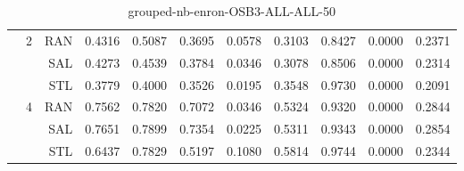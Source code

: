 \begin{center}
\begin{table}[htbp]
\begin{tabular}{ | r | r | r | r | r | r | r | r | r | r | r |}
 & \multirow{3}{*}{2} & RAN & 0.4316 & 0.5087 & 0.3695 & 0.0578 & 0.3103 & 0.8427 & 0.0000 & 0.2371\\ \cline{3-11}
 &   & SAL & 0.4273 & 0.4539 & 0.3784 & 0.0346 & 0.3078 & 0.8506 & 0.0000 & 0.2314\\ \cline{3-11}
 &   & STL & 0.3779 & 0.4000 & 0.3526 & 0.0195 & 0.3548 & 0.9730 & 0.0000 & 0.2091\\ \cline{2-11}
 & \multirow{3}{*}{4} & RAN & 0.7562 & 0.7820 & 0.7072 & 0.0346 & 0.5324 & 0.9320 & 0.0000 & 0.2844\\ \cline{3-11}
 &   & SAL & 0.7651 & 0.7899 & 0.7354 & 0.0225 & 0.5311 & 0.9343 & 0.0000 & 0.2854\\ \cline{3-11}
 &   & STL & 0.6437 & 0.7829 & 0.5197 & 0.1080 & 0.5814 & 0.9744 & 0.0000 & 0.2344\\ \cline{2-11}
\hline
\end{tabular}
\caption{grouped-nb-enron-OSB3-ALL-ALL-50}
\end{table}
\end{center}

